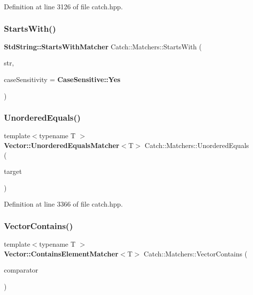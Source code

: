 Definition at line 3126 of file catch.\+hpp.

\mbox{\label{namespace_catch_1_1_matchers_a97c9ee09a70378ca7e8c6f9f01b0d6d1}} 
\subsubsection{StartsWith()}
{\footnotesize\ttfamily \textbf{ Std\+String\+::\+Starts\+With\+Matcher} Catch\+::\+Matchers\+::\+Starts\+With (\begin{DoxyParamCaption}\item[{std\+::string const \&}]{str,  }\item[{\textbf{ Case\+Sensitive\+::\+Choice}}]{case\+Sensitivity = {\ttfamily \textbf{ Case\+Sensitive\+::\+Yes}} }\end{DoxyParamCaption})}

\mbox{\label{namespace_catch_1_1_matchers_a3eced3a4f580478f4c5e67ed7e2915df}} 
\subsubsection{UnorderedEquals()}
{\footnotesize\ttfamily template$<$typename T $>$ \\
\textbf{ Vector\+::\+Unordered\+Equals\+Matcher}$<$T$>$ Catch\+::\+Matchers\+::\+Unordered\+Equals (\begin{DoxyParamCaption}\item[{std\+::vector$<$ T $>$ const \&}]{target }\end{DoxyParamCaption})}



Definition at line 3366 of file catch.\+hpp.

\mbox{\label{namespace_catch_1_1_matchers_ae8db5846328116fb36386893deaec944}} 
\subsubsection{VectorContains()}
{\footnotesize\ttfamily template$<$typename T $>$ \\
\textbf{ Vector\+::\+Contains\+Element\+Matcher}$<$T$>$ Catch\+::\+Matchers\+::\+Vector\+Contains (\begin{DoxyParamCaption}\item[{T const \&}]{comparator }\end{DoxyParamCaption})}



